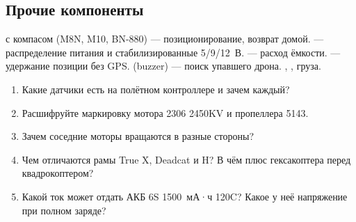 \subsection{Прочие компоненты}
 с компасом (M8N, M10, BN-880) — позиционирование, возврат домой.  — распределение питания и стабилизированные 5/9/12~В.  — расход ёмкости.  — удержание позиции без GPS.  (buzzer) — поиск упавшего дрона. , ,  груза.

\begin{exam}
\begin{enumerate}
\item Какие датчики есть на полётном контроллере и зачем каждый?
\item Расшифруйте маркировку мотора 2306 2450KV и пропеллера 5143.
\item Зачем соседние моторы вращаются в разные стороны?
\item Чем отличаются рамы True X, Deadcat и H? В чём плюс гексакоптера перед квадрокоптером?
\item Какой ток может отдать АКБ 6S 1500~мА·ч 120C? Какое у неё напряжение при полном заряде?
\end{enumerate}
\end{exam}
